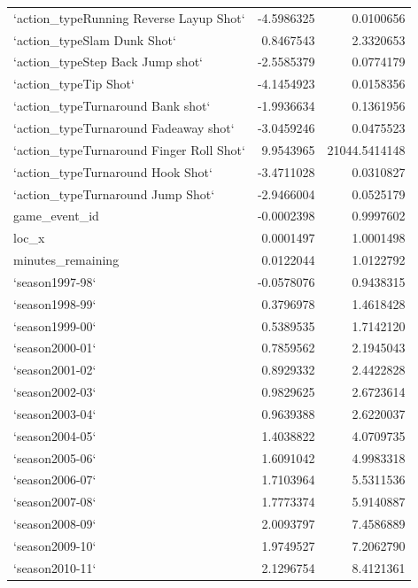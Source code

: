 \documentclass[american,]{article}
\begin{document}
\begin{longtable}{lrr}
`action\_typeRunning Reverse Layup Shot` & -4.5986325 & 0.0100656\\
\rowcolor{gray!6}  `action\_typeSlam Dunk Shot` & 0.8467543 & 2.3320653\\
\addlinespace
`action\_typeStep Back Jump shot` & -2.5585379 & 0.0774179\\
\rowcolor{gray!6}  `action\_typeTip Shot` & -4.1454923 & 0.0158356\\
`action\_typeTurnaround Bank shot` & -1.9936634 & 0.1361956\\
\rowcolor{gray!6}  `action\_typeTurnaround Fadeaway shot` & -3.0459246 & 0.0475523\\
`action\_typeTurnaround Finger Roll Shot` & 9.9543965 & 21044.5414148\\
\addlinespace
\rowcolor{gray!6}  `action\_typeTurnaround Hook Shot` & -3.4711028 & 0.0310827\\
`action\_typeTurnaround Jump Shot` & -2.9466004 & 0.0525179\\
\rowcolor{gray!6}  game\_event\_id & -0.0002398 & 0.9997602\\
loc\_x & 0.0001497 & 1.0001498\\
\rowcolor{gray!6}  minutes\_remaining & 0.0122044 & 1.0122792\\
\addlinespace
`season1997-98` & -0.0578076 & 0.9438315\\
\rowcolor{gray!6}  `season1998-99` & 0.3796978 & 1.4618428\\
`season1999-00` & 0.5389535 & 1.7142120\\
\rowcolor{gray!6}  `season2000-01` & 0.7859562 & 2.1945043\\
`season2001-02` & 0.8929332 & 2.4422828\\
\addlinespace
\rowcolor{gray!6}  `season2002-03` & 0.9829625 & 2.6723614\\
`season2003-04` & 0.9639388 & 2.6220037\\
\rowcolor{gray!6}  `season2004-05` & 1.4038822 & 4.0709735\\
`season2005-06` & 1.6091042 & 4.9983318\\
\rowcolor{gray!6}  `season2006-07` & 1.7103964 & 5.5311536\\
\addlinespace
`season2007-08` & 1.7773374 & 5.9140887\\
\rowcolor{gray!6}  `season2008-09` & 2.0093797 & 7.4586889\\
`season2009-10` & 1.9749527 & 7.2062790\\
\rowcolor{gray!6}  `season2010-11` & 2.1296754 & 8.4121361\\

\end{longtable}
\end{document}
